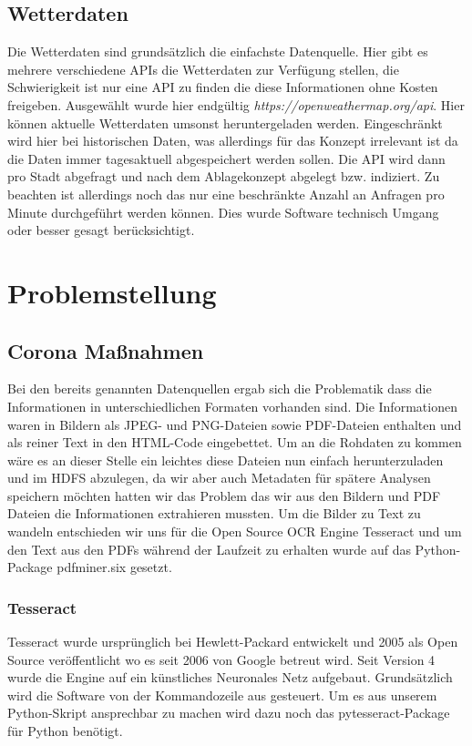 \documentclass[12pt,oneside,a4paper,parskip]{scrbook}
\begin{document}
\section{Wetterdaten}
Die Wetterdaten sind grunds\"atzlich die einfachste Datenquelle. Hier gibt es mehrere verschiedene APIs die Wetterdaten zur Verfügung stellen, die Schwierigkeit ist nur eine API zu finden die diese Informationen ohne Kosten freigeben.
Ausgew\"ahlt wurde hier endg\"ultig \textit{https://openweathermap.org/api}. Hier k\"onnen aktuelle Wetterdaten umsonst heruntergeladen werden. Eingeschr\"ankt wird hier bei historischen Daten, was allerdings f\"ur das Konzept irrelevant ist da die Daten immer tagesaktuell abgespeichert werden sollen. \newline
Die API wird dann pro Stadt abgefragt und nach dem Ablagekonzept abgelegt bzw. indiziert. Zu beachten ist allerdings noch das nur eine beschr\"ankte Anzahl an Anfragen pro Minute durchgef\"uhrt werden k\"onnen. Dies wurde Software technisch Umgang oder besser gesagt ber\"ucksichtigt.

\chapter{Problemstellung}
\section{Corona Maßnahmen}
Bei den bereits genannten Datenquellen ergab sich die Problematik dass die Informationen in unterschiedlichen Formaten vorhanden sind. Die Informationen waren in Bildern als JPEG- und PNG-Dateien sowie PDF-Dateien enthalten und als reiner Text in den HTML-Code eingebettet. Um an die Rohdaten zu kommen wäre es an dieser Stelle ein leichtes diese Dateien nun einfach herunterzuladen und im HDFS abzulegen, da wir aber auch Metadaten für spätere Analysen speichern möchten hatten wir das Problem das wir aus den Bildern und PDF Dateien die Informationen extrahieren mussten. Um die Bilder zu Text zu wandeln entschieden wir uns für die Open Source OCR Engine Tesseract und um den Text aus den PDFs während der Laufzeit zu erhalten wurde auf das Python-Package pdfminer.six gesetzt.

\subsection{Tesseract}
Tesseract wurde ursprünglich bei Hewlett-Packard entwickelt und 2005 als Open Source veröffentlicht wo es seit 2006 von Google betreut wird.
Seit Version 4 wurde die Engine auf ein künstliches Neuronales Netz aufgebaut. Grundsätzlich wird die Software von der Kommandozeile aus gesteuert. Um es aus unserem Python-Skript ansprechbar zu machen wird dazu noch das pytesseract-Package für Python benötigt. 
\end{document}
